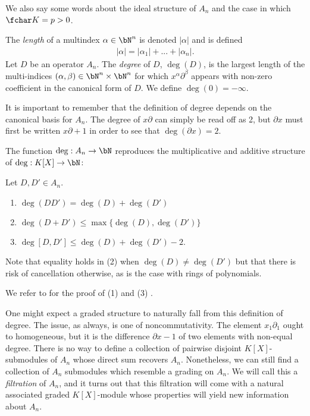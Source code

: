 We also say some words about the ideal structure of $A_n$ and the case in which $\fchar K = p > 0$.

\begin{defn}\label{defn:degree-of-Weyl-operator}
	The \emph{length} of a multindex $\alpha \in \bN^n$ is denoted $|\alpha|$ and is defined
	\begin{align*}
		|\alpha| = |\alpha_1| + ... + |\alpha_n|.
	\end{align*}
	Let $D$ be an operator $A_n$. The \emph{degree} of $D$, $\deg(D)$, is the largest length of the multi-indices $(\alpha, \beta) \in \bN^n \times \bN^n$ for which $x^\alpha\partial^\beta$ appears with non-zero coefficient in the canonical form of $D$. We define $\deg(0) = -\infty$.
\end{defn}
It is important to remember that the definition of degree depends on the canonical basis for $A_n$. The degree of $x\partial$ can simply be read off as 2, but $\partial x$ must first be written $x\partial + 1$ in order to see that $\deg(\partial x) = 2$.

The function $\deg: A_n\to \bN$ reproduces the multiplicative and additive structure of $\deg:K[X]\to \bN$:
\begin{thm}\label{thm:degree-properties}
    Let $D,D' \in A_n$.
	\begin{enumerate}[(1)]
		\item $\deg(DD') = \deg(D) + \deg(D')$
		\item $\deg(D+D') \leq \max\{\deg(D), \deg(D')\}$
		\item $\deg[D,D']\leq \deg(D) + \deg(D') - 2$.
	\end{enumerate}
\end{thm}
Note that equality holds in (2) when $\deg(D) \neq \deg(D')$ but that there is risk of cancellation otherwise, as is the case with rings of polynomials.
\begin{prf}
	We refer to \cite{Gieseker75} for the proof of (1) and (3) .
\end{prf}

One might expect a graded structure to naturally fall from this definition of degree. The issue, as always, is one of noncommutativity. The element $x_1\partial_1$ ought to homogeneous, but it is the difference $\partial x - 1$ of two elements with non-equal degree. There is no way to define a collection of pairwise disjoint $K[X]$-submodules of $A_n$ whose direct sum recovers $A_n$. Nonetheless, we can still find a collection of $A_n$ submodules which resemble a grading on $A_n$. We will call this a \emph{filtration} of $A_n$, and it turns out that this filtration will come with a natural associated graded $K[X]$-module whose properties will yield new information about $A_n$.

